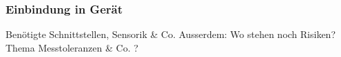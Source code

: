 \documentclass[main.tex]{subfiles} %
\begin{document}

\subsubsection{Einbindung in Gerät}

Benötigte Schnittstellen, Sensorik \& Co. Ausserdem: Wo stehen noch Risiken?
Thema Messtoleranzen \& Co. ?
\end{document}
